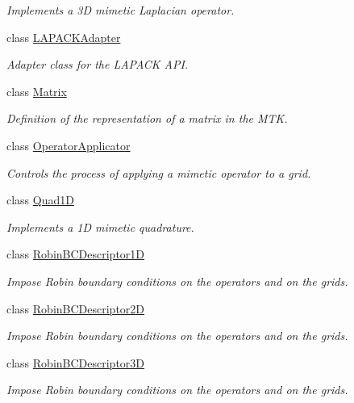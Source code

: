 \begin{DoxyCompactItemize}
\begin{DoxyCompactList}\small\item\em Implements a 3\+D mimetic Laplacian operator. \end{DoxyCompactList}\item 
class \hyperlink{classmtk_1_1LAPACKAdapter}{L\+A\+P\+A\+C\+K\+Adapter}
\begin{DoxyCompactList}\small\item\em Adapter class for the L\+A\+P\+A\+C\+K A\+P\+I. \end{DoxyCompactList}\item 
class \hyperlink{classmtk_1_1Matrix}{Matrix}
\begin{DoxyCompactList}\small\item\em Definition of the representation of a matrix in the M\+T\+K. \end{DoxyCompactList}\item 
class \hyperlink{classmtk_1_1OperatorApplicator}{Operator\+Applicator}
\begin{DoxyCompactList}\small\item\em Controls the process of applying a mimetic operator to a grid. \end{DoxyCompactList}\item 
class \hyperlink{classmtk_1_1Quad1D}{Quad1\+D}
\begin{DoxyCompactList}\small\item\em Implements a 1\+D mimetic quadrature. \end{DoxyCompactList}\item 
class \hyperlink{classmtk_1_1RobinBCDescriptor1D}{Robin\+B\+C\+Descriptor1\+D}
\begin{DoxyCompactList}\small\item\em Impose Robin boundary conditions on the operators and on the grids. \end{DoxyCompactList}\item 
class \hyperlink{classmtk_1_1RobinBCDescriptor2D}{Robin\+B\+C\+Descriptor2\+D}
\begin{DoxyCompactList}\small\item\em Impose Robin boundary conditions on the operators and on the grids. \end{DoxyCompactList}\item 
class \hyperlink{classmtk_1_1RobinBCDescriptor3D}{Robin\+B\+C\+Descriptor3\+D}
\begin{DoxyCompactList}\small\item\em Impose Robin boundary conditions on the operators and on the grids. \end{DoxyCompactList}\item 

\end{DoxyCompactItemize}
